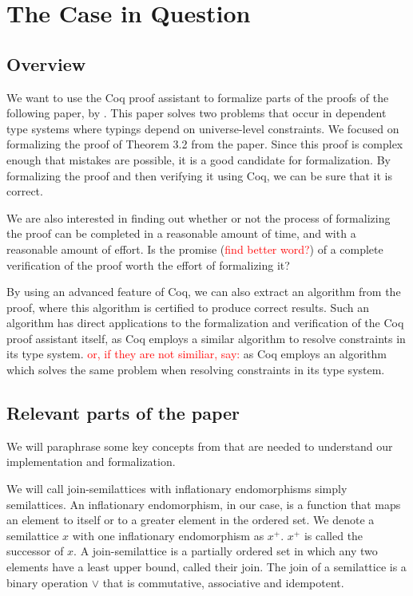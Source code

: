 \chapter{The Case in Question}
\label{ch:the_case_in_question}

\section{Overview}
\label{sec:overview}

We want to use the Coq proof assistant to formalize parts of the proofs of the following paper, by \citeauthor{mbezem} \cite{mbezem}.
This paper solves two problems that occur in dependent type systems where typings depend
on universe-level constraints. We focused on formalizing the proof of Theorem 3.2 from the paper.
Since this proof is complex enough that mistakes are possible, it is a good candidate for formalization.
By formalizing the proof and then verifying it using Coq, we can be sure that it is correct.

We are also interested in finding out whether or not the process of formalizing the proof
can be completed in a reasonable amount of time, and with a reasonable amount of effort.
Is the promise (\textcolor{red}{find better word?}) of a complete verification of the proof worth the effort of formalizing it?

By using an advanced feature of Coq, we can also extract an algorithm from the proof,
where this algorithm is certified to produce correct results.
Such an algorithm has direct applications to the formalization and verification of the Coq proof assistant itself,
as Coq employs a similar algorithm to resolve constraints in its type system.
\textcolor{red}{or, if they are not similiar, say:}
as Coq employs an algorithm which solves the same problem when resolving constraints in its type system.

\section{Relevant parts of the paper}
\label{sec:relevant_parts_of_the_paper}

We will paraphrase some key concepts from \cite{mbezem} that are needed to understand
our implementation and formalization.

We will call join-semilattices with inflationary endomorphisms simply semilattices.
An inflationary endomorphism, in our case, is a function
that maps an element to itself or to a greater element in the ordered set.
We denote a semilattice $x$ with one inflationary endomorphism as $x^+$.
$x^+$ is called the successor of $x$.
A join-semilattice is a partially ordered set in which any two elements have a least upper bound,
called their join.
The join of a semilattice is a binary operation $\lor$ that is commutative, associative and idempotent.

